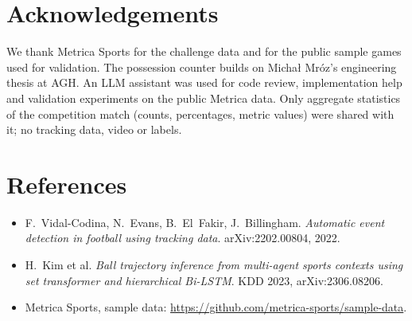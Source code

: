 \documentclass[11pt,a4paper]{article}
\begin{document}
\section*{Acknowledgements}
We thank Metrica Sports for the challenge data and for the public sample games used for validation. The possession
counter builds on Michał Mróz's engineering thesis at AGH. An LLM assistant was used for code review, implementation help and validation experiments on
the public Metrica data. Only aggregate statistics of the competition match (counts, percentages, metric values) were
shared with it; no tracking data, video or labels.

\section*{References}
\begin{itemize}[leftmargin=*]
  \item F.~Vidal-Codina, N.~Evans, B.~El~Fakir, J.~Billingham. \emph{Automatic event detection in football using
    tracking data}. arXiv:2202.00804, 2022.
  \item H.~Kim et al. \emph{Ball trajectory inference from multi-agent sports contexts using set transformer and
    hierarchical Bi-LSTM}. KDD 2023, arXiv:2306.08206.
  \item Metrica Sports, sample data: \url{https://github.com/metrica-sports/sample-data}.
\end{itemize}
\end{document}
